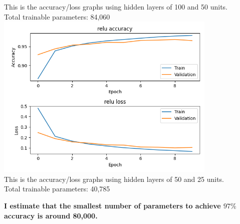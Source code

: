 \documentclass[a4paper,14pt]{extarticle}
\begin{document}
\begin{center}
This is the accuracy/loss graphs using hidden layers of 100 and 50 units.\\Total trainable parameters: 84,060\\
\includegraphics[width=400]{Figure_1_50_25.png}\\
This is the accuracy/loss graphs using hidden layers of 50 and 25 units.\\Total trainable parameters: 40,785
\end{center}
\textbf{I estimate that the smallest number of parameters to achieve $97\%$ accuracy is around 80,000.}
\end{document}
